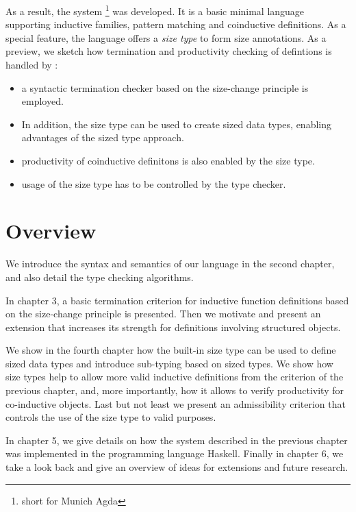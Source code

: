As a result, the system \mugda\footnote{short for Munich Agda} was developed.
It is a basic minimal language supporting inductive families, pattern matching and coinductive definitions.
As a special feature, the language offers a \emph{size type} to form size annotations. 
As a preview, we sketch how termination and productivity checking of defintions is handled by \mugda:
\begin{itemize}
\item
a syntactic termination checker based on the size-change principle is employed.
\item
In addition, the size type can be used to create sized data types, enabling advantages of the 
sized type approach.
\item
productivity of coinductive definitons is also enabled by the size type.
\item
usage of the size type has to be controlled by the type checker.
\end{itemize}  
\section{Overview}
We introduce the syntax and semantics of our \mugda language in the second chapter,
 and also detail the type checking algorithms.

In chapter 3, a basic termination criterion for inductive function definitions based on the size-change principle is presented. Then we motivate and present an extension that increases its strength for definitions involving structured objects.

We show in the fourth chapter how the built-in size type can be used to define sized data types and introduce sub-typing based on sized types.
We show how size types help to allow more valid inductive definitions from the criterion of the previous chapter,
and, more importantly, how it allows to verify productivity for co-inductive objects.
Last but not least we present an admissibility criterion that controls the use of the size type to valid purposes.

In chapter 5, we give details on how the system described in the previous chapter was implemented in the programming language Haskell.
Finally in chapter 6, we take a look back and give an overview of ideas for extensions and future research.





